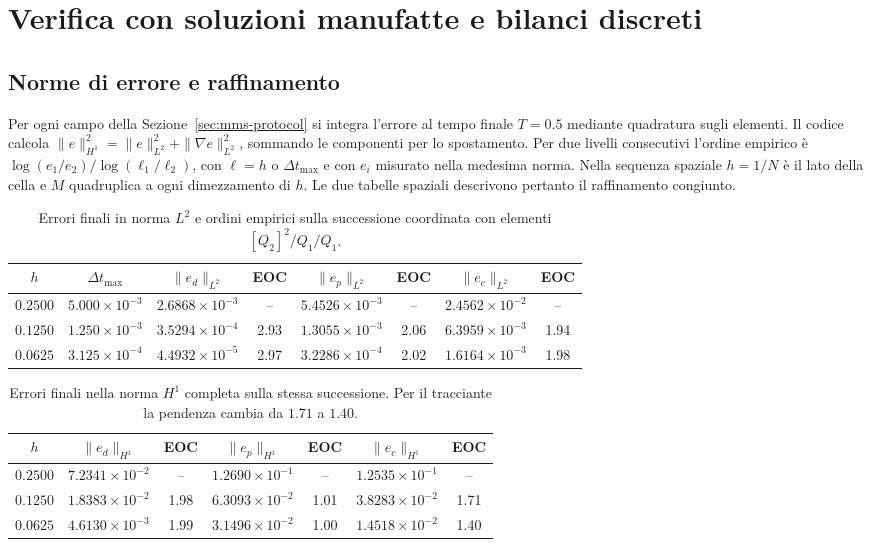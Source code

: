 \section{Verifica con soluzioni manufatte e bilanci discreti}
\label{app:mms}
\setcounter{figure}{0}\setcounter{table}{0}\setcounter{equation}{0}

\subsection{Norme di errore e raffinamento}
Per ogni campo della Sezione~\ref{sec:mms-protocol} si integra l'errore al tempo finale $T=0.5$ mediante quadratura sugli elementi. Il codice calcola $\|e\|_{H^1}^2=\|e\|_{L^2}^2+\|\nabla e\|_{L^2}^2$, sommando le componenti per lo spostamento. Per due livelli consecutivi l'ordine empirico è $\log(e_1/e_2)/\log(\ell_1/\ell_2)$, con $\ell=h$ o $\Delta t_{\max}$ e con $e_i$ misurato nella medesima norma. Nella sequenza spaziale $h=1/N$ è il lato della cella e $M$ quadruplica a ogni dimezzamento di $h$. Le due tabelle spaziali descrivono pertanto il raffinamento congiunto.

\begin{table}[H]
\centering
\caption{Errori finali in norma $L^2$ e ordini empirici sulla successione coordinata con elementi $[Q_2]^2/Q_1/Q_1$.}
\label{tab:app-mms-spatial-l2}
\small
\setlength{\tabcolsep}{7pt}
\begin{tabular}{@{}cccccccc@{}}
\toprule
$h$ & $\Delta t_{\max}$ & $\|e_d\|_{L^2}$ & EOC & $\|e_p\|_{L^2}$ & EOC & $\|e_c\|_{L^2}$ & EOC \\
\midrule
$0.2500$ & $5.000\times10^{-3}$ & $2.6868\times10^{-3}$ & --   & $5.4526\times10^{-3}$ & --   & $2.4562\times10^{-2}$ & --   \\
$0.1250$ & $1.250\times10^{-3}$ & $3.5294\times10^{-4}$ & 2.93 & $1.3055\times10^{-3}$ & 2.06 & $6.3959\times10^{-3}$ & 1.94 \\
$0.0625$ & $3.125\times10^{-4}$ & $4.4932\times10^{-5}$ & 2.97 & $3.2286\times10^{-4}$ & 2.02 & $1.6164\times10^{-3}$ & 1.98 \\
\bottomrule
\end{tabular}
\end{table}

\begin{table}[H]
\centering
\caption{Errori finali nella norma $H^1$ completa sulla stessa successione. Per il tracciante la pendenza cambia da $1.71$ a $1.40$.}
\label{tab:app-mms-spatial-h1}
\small
\setlength{\tabcolsep}{8pt}
\begin{tabular}{@{}ccccccc@{}}
\toprule
$h$ & $\|e_d\|_{H^1}$ & EOC & $\|e_p\|_{H^1}$ & EOC & $\|e_c\|_{H^1}$ & EOC \\
\midrule
$0.2500$ & $7.2341\times10^{-2}$ & --   & $1.2690\times10^{-1}$ & --   & $1.2535\times10^{-1}$ & --   \\
$0.1250$ & $1.8383\times10^{-2}$ & 1.98 & $6.3093\times10^{-2}$ & 1.01 & $3.8283\times10^{-2}$ & 1.71 \\
$0.0625$ & $4.6130\times10^{-3}$ & 1.99 & $3.1496\times10^{-2}$ & 1.00 & $1.4518\times10^{-2}$ & 1.40 \\
\bottomrule
\end{tabular}
\end{table}

